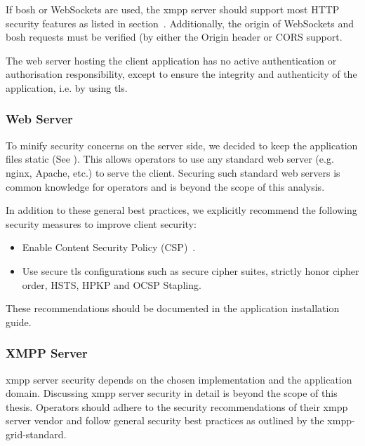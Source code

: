 If \gls{bosh} or WebSockets are used, the \gls{xmpp} server should support most HTTP security features as listed in section~. Additionally, the origin of WebSockets and \gls{bosh} requests must be verified (by either the Origin header or CORS support.~\cite{rfc6455}\cite{cross-origin-resource-sharing}

The web server hosting the client application has no active authentication or authorisation responsibility, except to ensure the integrity and authenticity of the application, i.e. by using \gls{tls}.

\subsubsection{Web Server}\label{sec:web-server}

To minify security concerns on the server side, we decided to keep the application files static (See ).
This allows operators to use any standard web server (e.g. nginx, Apache, etc.) to serve the client.
Securing such standard web servers is common knowledge for operators and is beyond the scope of this analysis.

In addition to these general best practices, we explicitly recommend the following security measures to improve client security:

\begin{itemize}
    \item Enable Content Security Policy (CSP)~\cite{w3c-csp}.
    \item Use secure \gls{tls} configurations such as secure cipher suites, strictly honor cipher order, HSTS, HPKP and OCSP Stapling\cite{mozilla-tls-recommendations}.
\end{itemize}

These recommendations should be documented in the application installation guide.

\subsubsection{XMPP Server}

\gls{xmpp} server security depends on the chosen implementation and the application domain.
Discussing \gls{xmpp} server security in detail is beyond the scope of this thesis.
Operators should adhere to the security recommendations of their \gls{xmpp} server vendor and follow general security best practices as outlined by the \gls{xmpp-grid-standard}.

